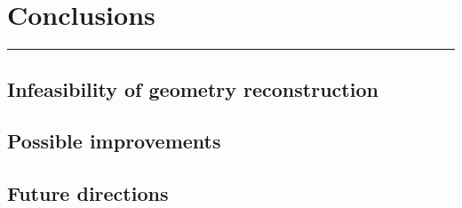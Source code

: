 \chapter{Conclusions}\label{ch:conclusion}

\vspace{-1.5 em}
\begin{addmargin}[-0.5cm]{0cm}
  \minitoc
\end{addmargin}
\hrule
\vspace{1.5 em}

\section*{Infeasibility of geometry reconstruction}
\section*{Possible improvements}
\section*{Future directions}
